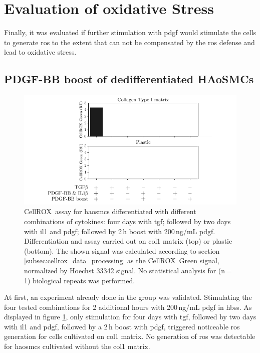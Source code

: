 \section{Evaluation of oxidative Stress}
\label{sec:oxStress}
Finally, it was evaluated if further stimulation with \ac{pdgf} would stimulate the cells to generate \ac{ros} to the extent that can not be compensated by the \ac{ros} defense and lead to oxidative stress.

    \subsection{PDGF-BB boost of dedifferentiated HAoSMCs}

    \begin{figure}[h!]
    \capstart
        \centering
    	\includegraphics{Abbildung/CellROX_initial_cond.pdf}

    	\begin{minipage}{\captionwidth}
    		\caption[repeat_Lisa]{ \newline CellROX\texttrademark~assay for \acp{haosmc} differentiated with different combinations of cytokines: four days with \ac{tgf}; followed by two days with \ac{il1} and \ac{pdgf}; followed by 2\,h boost with 200\,ng/mL \ac{pdgf}. Differentiation and assay carried out on \ac{col1} matrix (top) or plastic (bottom). The shown signal was calculated according to section \ref{subsec:cellrox_data_processing} as the CellROX\texttrademark~Green signal, normalized by Hoechst 33342 signal. No statistical analysis for (n\,=\,1) biological repeats was performed. }
    		\label{fig:cellrox_8con}
    	\end{minipage}
    \end{figure}

    At first, an experiment already done in the group was validated. Stimulating the four tested combinations for 2 additional hours with 200\,ng/mL \ac{pdgf} in \ac{hbss}. As displayed in figure \ref{fig:cellrox_8con}, only stimulation for four days with \ac{tgf}, followed by two days with \ac{il1} and \ac{pdgf}, followed by a 2\,h boost with \ac{pdgf}, triggered noticeable \ac{ros} generation for cells cultivated on \ac{col1} matrix. No generation of \ac{ros} was detectable for \acp{haosmc} cultivated without the \ac{col1} matrix.

